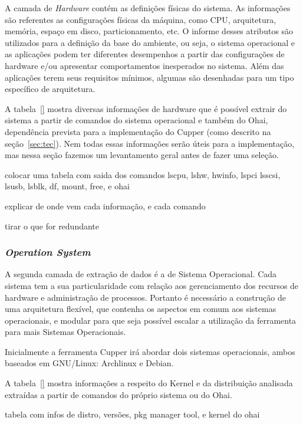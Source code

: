A camada de \textit{Hardware} contém as definições físicas do sistema.
As informações são referentes as configurações físicas da máquina, como
CPU, arquitetura, memória, espaço em disco, particionamento, etc. O informe desses atributos
são utilizados para a definição da base do ambiente, ou seja, o sistema
operacional e as aplicações podem ter diferentes desempenhos a partir das
configurações de hardware e/ou apresentar comportamentos inesperados no sistema.
Além das aplicações terem seus requisitos mínimos, algumas são desenhadas
para um tipo específico de arquitetura.

A tabela~\ref{} mostra diversas informações de hardware que é possível extrair
do sistema a partir de comandos do sistema operacional e também do Ohai, 
dependência prevista para a implementação do Cupper (como descrito na 
seção~\ref{sec:tec}). Nem todas essas informações serão úteis para a 
implementação, mas nessa seção fazemos um levantamento geral antes de fazer uma
seleção.

{\color{red} colocar uma tabela com saida dos comandos lscpu, lshw, hwinfo, lspci
lsscsi, lsusb, lsblk, df, mount, free, e ohai}

{\color{red} explicar de onde vem cada informação, e cada comando}

{\color{red} tirar o que for redundante}


\subsubsection{\textit{Operation System}}
\label{sec:cam-os}

A segunda camada de extração de dados é a de Sistema Operacional. 
Cada sistema tem a sua particularidade com relação aos gerenciamento dos 
recursos de hardware e administração de processos. Portanto é necessário a 
construção de uma arquitetura flexível, que contenha os aspectos em comum aos
sistemas operacionais, e modular para que seja possível escalar a utilização 
da ferramenta para mais Sistemas Operacionais.

Inicialmente a ferramenta Cupper irá abordar dois sistemas operacionais, 
ambos baseados em GNU/Linux: Archlinux e Debian.

A tabela~\ref{} mostra informações a respeito do Kernel e da distribuição
analisada extraídas a partir de comandos do próprio sistema ou do Ohai.


{\color{red} tabela com infos de distro, versões, pkg manager tool, e kernel do ohai}

